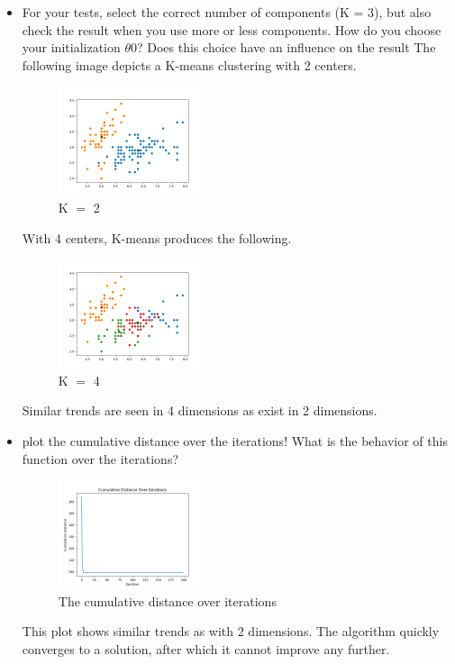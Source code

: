 \documentclass[a4paper]{article}
\begin{document}
\begin{itemize}
		\item For your tests, select the correct number of components (K = 3), but also check the result when you use more or less components. How do you choose your initialization $\theta$0? Does this choice have an inﬂuence on the result
		The following image depicts a K-means clustering with 2 centers.
	\begin{figure}[h]
		\begin{center}
			\includegraphics[width=0.4\textwidth]{kmeans_4dim_K2.png}
			\caption{K $=$ 2}
		\end{center}
	\end{figure}

	With 4 centers, K-means produces the following.
	\begin{figure}[h]
		\begin{center}
			\includegraphics[width=0.4\textwidth]{kmeans_4dim_K4.png}
			\caption{K $=$ 4}
		\end{center}
	\end{figure}
	
	Similar trends are seen in 4 dimensions as exist in 2 dimensions.
		
		\item plot the cumulative distance over the iterations! What is the behavior of this function over the iterations?
		
		\begin{figure}[h]
			\begin{center}
				\includegraphics[width=0.4\textwidth]{kmeans_4dim_conv.png}
				\caption{The cumulative distance over iterations}
			\end{center}
		\end{figure}
		This plot shows similar trends as with 2 dimensions.  The algorithm quickly converges to a solution, after which it cannot improve any further.\\
		
		
	\end{itemize}	
\end{document}
